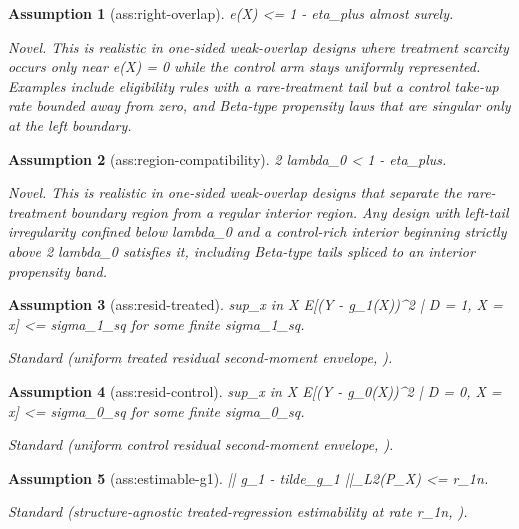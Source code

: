 \documentclass{article}
\newtheorem{assumption}{Assumption}
\begin{document}
\begin{assumption}[ass:right-overlap]\label{ass:right-overlap}
e(X) <= 1 - eta_plus almost surely.
\par\smallskip\noindent\emph{Novel.} This is realistic in one-sided weak-overlap designs where treatment scarcity occurs only near e(X) = 0 while the control arm stays uniformly represented. Examples include eligibility rules with a rare-treatment tail but a control take-up rate bounded away from zero, and Beta-type propensity laws that are singular only at the left boundary.
\end{assumption}

\begin{assumption}[ass:region-compatibility]\label{ass:region-compatibility}
2 lambda_0 < 1 - eta_plus.
\par\smallskip\noindent\emph{Novel.} This is realistic in one-sided weak-overlap designs that separate the rare-treatment boundary region from a regular interior region. Any design with left-tail irregularity confined below lambda_0 and a control-rich interior beginning strictly above 2 lambda_0 satisfies it, including Beta-type tails spliced to an interior propensity band.
\end{assumption}

\begin{assumption}[ass:resid-treated]\label{ass:resid-treated}
sup_{x in X} E[(Y - g_1(X))^2 | D = 1, X = x] <= sigma_1_sq for some finite sigma_1_sq.
\par\smallskip\noindent\emph{Standard} (uniform treated residual second-moment envelope, \cite{Dorn2025WeakOverlapDRTStats}).
\end{assumption}

\begin{assumption}[ass:resid-control]\label{ass:resid-control}
sup_{x in X} E[(Y - g_0(X))^2 | D = 0, X = x] <= sigma_0_sq for some finite sigma_0_sq.
\par\smallskip\noindent\emph{Standard} (uniform control residual second-moment envelope, \cite{Dorn2025WeakOverlapDRTStats}).
\end{assumption}

\begin{assumption}[ass:estimable-g1]\label{ass:estimable-g1}
|| g_1 - tilde_g_1 ||_{L2(P_X)} <= r_1n.
\par\smallskip\noindent\emph{Standard} (structure-agnostic treated-regression estimability at rate r_1n, \cite{JinSyrgkanis2024StructureAgnosticDR}).
\end{assumption}
\end{document}
